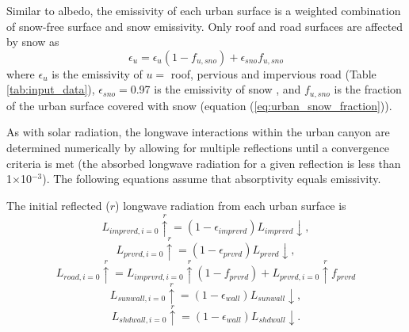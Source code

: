 \documentclass[12pt,authoryear]{elsarticle}
\numberwithin{equation}{section} %
\begin{document}
Similar to albedo, the emissivity of each urban surface is a weighted combination of snow-free surface and snow emissivity. Only roof and road surfaces are affected by snow as
\begin{equation}
\epsilon_{u} = \epsilon_{u}(1-f_{u,sno}) +\epsilon_{sno}f_{u,sno}
\end{equation}
where $\epsilon_{u}$ is the emissivity of $u=$ roof, pervious and impervious road (Table \ref{tab:input_data}), $\epsilon_{sno}=$0.97 is the emissivity of snow \citet{olesonTechnicalDescriptionCommunity2004}, and $f_{u,sno}$ is the fraction of the urban surface covered with snow (equation (\ref{eq:urban_snow_fraction})).

As with solar radiation, the longwave interactions within the urban canyon are determined numerically by allowing for multiple reflections until a convergence criteria is met (the absorbed longwave radiation for a given reflection is less than 1$\times$10$^{-3}$). The following equations assume that absorptivity equals emissivity.

The initial reflected ($r$) longwave radiation from each urban surface is 
\begin{equation}
L_{imprvrd,i=0}\overset{r}{\uparrow} = (1-\epsilon_{imprvrd})L_{imprvrd}\downarrow,
\end{equation}
\begin{equation}
L_{prvrd,i=0}\overset{r}{\uparrow} = (1-\epsilon_{prvrd})L_{prvrd}\downarrow,
\end{equation}
\begin{equation}
L_{road,i=0}\overset{r}{\uparrow}=L_{imprvrd,i=0}\overset{r}{\uparrow}(1-f_{prvrd})+L_{prvrd,i=0}\overset{r}{\uparrow}f_{prvrd}
\end{equation}
\begin{equation}
L_{sunwall,i=0}\overset{r}{\uparrow}=(1-\epsilon_{wall})L_{sunwall}\downarrow,
\end{equation}
\begin{equation}
L_{shdwall,i=0}\overset{r}{\uparrow}=(1-\epsilon_{wall})L_{shdwall}\downarrow.
\end{equation}
\end{document}
